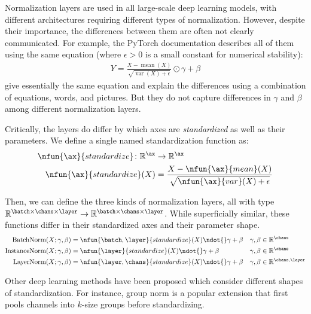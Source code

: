 Normalization layers are used in all large-scale deep learning models, with different architectures requiring different types of normalization. However, despite their importance, the differences between them are often not clearly communicated. For example, the PyTorch documentation \citep{pytorchdoc} describes all of them using the same equation (where $\epsilon > 0$ is a small constant for numerical stability): 
\begin{align*}
   Y = \frac{X - \operatorname{mean}(X)}{\sqrt{\operatorname{var}(X) + \epsilon}} \odot \gamma + \beta
\end{align*}
\citet{wu+he:2018} give essentially the same equation and explain the differences using a combination of equations, words, and pictures. But they do not capture differences in $\gamma$ and $\beta$ among different normalization layers.

Critically, the layers do differ by which axes are \textit{standardized} as well as their parameters. We define a single named standardization function as:
\begin{align*}
  \nfun{\ax}{standardize} \colon \mathbb{R}^{\ax} &\rightarrow \mathbb{R}^{\ax} \\
  \nfun{\ax}{standardize}(X) &= \frac{X - \nfun{\ax}{mean}(X)}{\sqrt{\nfun{\ax}{var}(X) + \epsilon}}
\end{align*}


Then, we can define the three kinds of normalization layers, all with type $\reals^{{\batch \times \chans \times \layer}} \rightarrow \reals^{{\batch \times \chans \times \layer}}$. While superficially similar, these functions differ in their standardized axes and their parameter shape. 
\begin{align*}
\text{BatchNorm}(X; \gamma, \beta) &= \nfun{\batch,\layer}{standardize}(X) \ndot{} \gamma + \beta & \gamma, \beta &\in \mathbb{R}^{\chans} \\
\text{InstanceNorm}(X; \gamma, \beta) &= \nfun{\layer}{standardize}(X) \ndot{} \gamma + \beta & \gamma, \beta &\in \mathbb{R}^{\chans} \\
\text{LayerNorm}(X; \gamma, \beta) &= \nfun{\layer,\chans}{standardize}(X) \ndot{} \gamma + \beta & \gamma, \beta &\in \mathbb{R}^{\chans,\layer}
\end{align*}

\iffalse
Other deep learning methods have been proposed which consider different shapes of standardization. For instance, group norm is a popular extension that first pools channels into $k$-size groups before standardizing. 

